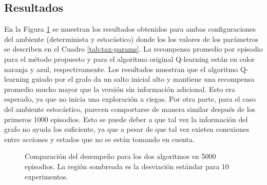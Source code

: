 \subsection{Resultados}

En la Figura \ref{fig:results-taxi} se muestran los resultados obtenidos
para ambas configuraciones del ambiente (determinista y estocástico) donde los
los valores de los parámetros se describen en el Cuadro \ref{tab:tax-params}.
La recompensa promedio por episodio para el método propuesto y para el algoritmo
original Q-learning están en color naranja y azul, respectivamente. 
Los resultados muestran que el algoritmo Q-learning guiado por el grafo da un salto inicial alto y mantiene una recompensa promedio mucho mayor que la versión sin información adicional. Esto era esperado, ya que 
no inicia una exploración a ciegas. Por otra parte, para el caso 
del ambiente estocástico, parecen comportarse de manera similar después de los
primeros 1000 episodios. Esto se puede deber a que tal vez la información del 
grafo no ayuda los suficiente, ya que a pesar de que tal vez existen
conexiones entre acciones y estados que no se están tomando en cuenta.


\begin{figure}[H]
  \centering
  \hfill
  \caption{Comparación del desempeño para los dos algoritmos en 5000 episodios. La región sombreada es la desviación estándar para 10 experimentos.}
  \label{fig:results-taxi}
\end{figure}
